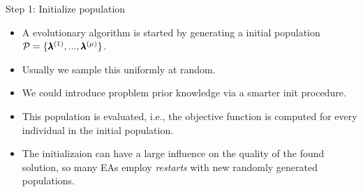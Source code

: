 \begin{frame}{Step 1: Initialize population}


    \begin{itemize}
            \item A evolutionary algorithm is started by generating a initial population $\mathcal{P} = \{\pmb{\lambda}^{(1)}, ..., \pmb{\lambda}^{(\mu)}\}$.
            \item Usually we sample this uniformly at random.
            \item We could introduce propblem prior knowledge via a smarter init procedure.
            \item This population is evaluated, i.e., the objective function is computed for every individual in the initial population.
            \item The initializaion can have a large influence on the quality of the found solution, so many EAs employ \textit{restarts} with new randomly generated populations.
    \end{itemize}

\end{frame}

